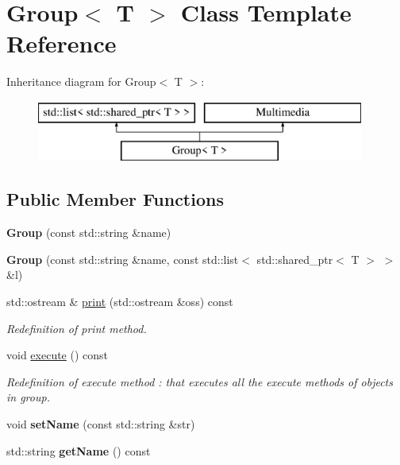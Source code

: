 \hypertarget{class_group}{\section{Group$<$ T $>$ Class Template Reference}
\label{class_group}
}
Inheritance diagram for Group$<$ T $>$\-:\begin{figure}[H]
\begin{center}
\leavevmode
\includegraphics[height=2.000000cm]{class_group}
\end{center}
\end{figure}
\subsection*{Public Member Functions}
\begin{DoxyCompactItemize}
\item 
\hypertarget{class_group_af5e1e4f88f2ef4c53eaaf8833f1d4c56}{{\bfseries Group} (const std\-::string \&name)}\label{class_group_af5e1e4f88f2ef4c53eaaf8833f1d4c56}

\item 
\hypertarget{class_group_ac82298c5f46348f6ad7ed544e886e859}{{\bfseries Group} (const std\-::string \&name, const std\-::list$<$ std\-::shared\-\_\-ptr$<$ T $>$ $>$ \&l)}\label{class_group_ac82298c5f46348f6ad7ed544e886e859}

\item 
\hypertarget{class_group_a0554f19ad7a9e944050db55b8d051a8f}{std\-::ostream \& \hyperlink{class_group_a0554f19ad7a9e944050db55b8d051a8f}{print} (std\-::ostream \&oss) const }\label{class_group_a0554f19ad7a9e944050db55b8d051a8f}

\begin{DoxyCompactList}\small\item\em Redefinition of print method. \end{DoxyCompactList}\item 
\hypertarget{class_group_a978a041512fc9aaf91a80621a64c1d4c}{void \hyperlink{class_group_a978a041512fc9aaf91a80621a64c1d4c}{execute} () const }\label{class_group_a978a041512fc9aaf91a80621a64c1d4c}

\begin{DoxyCompactList}\small\item\em Redefinition of execute method \-: that executes all the execute methods of objects in group. \end{DoxyCompactList}\item 
\hypertarget{class_group_a91f595359a983e41f4abb2b6fbc393ce}{void {\bfseries set\-Name} (const std\-::string \&str)}\label{class_group_a91f595359a983e41f4abb2b6fbc393ce}

\item 
\hypertarget{class_group_afea29527a3a2f1c6ac7d342cce752074}{std\-::string {\bfseries get\-Name} () const }\label{class_group_afea29527a3a2f1c6ac7d342cce752074}

\end{DoxyCompactItemize}
